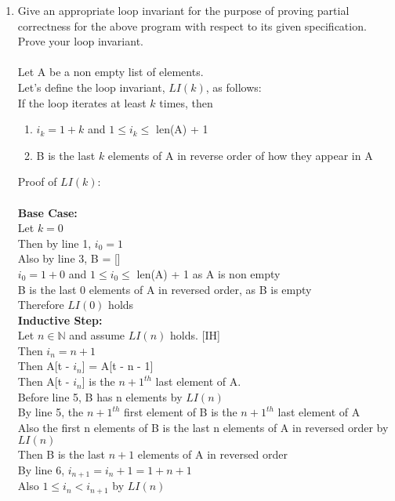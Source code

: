 \documentclass{article}
\begin{document}
\begin{enumerate}
\begin{enumerate}
	\item Give an appropriate loop invariant for the purpose of proving partial correctness for the above program 
	with respect to its given specification. \\
	Prove your loop invariant.\\\\
	Let A be a non empty list of elements.\\
	Let's define the loop invariant, $LI(k)$, as follows:\\
	If the loop iterates at least $k$ times, then
	\begin{enumerate}
	   \item ${i}_{k} = 1 + k$ and $1 \le {i}_{k}\le$ len(A) + 1
	   \item B is the last $k$ elements of A in reverse order of how they appear in A
	\end{enumerate}
\newpage
    Proof of $LI(k):$\\\\
	\textbf{Base Case:}\\
	Let $k = 0$\\
	Then by line 1, ${i}_{0} = 1$\\
	Also by line 3, B = [\:]\\
	${i}_{0} = 1 + 0$ and $1 \le {i}_{0} \le$ len(A) + 1 as A is non empty\\
	B is the last 0 elements of A in reversed order, as B is empty\\
	Therefore $LI(0)$ holds\\
	\textbf{Inductive Step:}\\
	Let $n \in\mathbb{N}$ and assume $LI(n)$ holds. [IH]\\
	Then ${i}_{n} = n + 1$\\
	Then A[t - ${i}_{n}$] = A[t - n - 1]\\
	Then A[t - ${i}_{n}$] is the ${n+1}^{th}$ last element of A.\\
	Before line 5, B has n elements by $LI(n)$\\
	By line 5, the ${n+1}^{th}$ first element of B is the ${n+1}^{th}$ last element of A\\
	Also the first n elements of B is the last n elements of A in reversed order by $LI(n)$\\
	Then B is the last $n+1$ elements of A in reversed order\\
	By line 6, ${i}_{n+1} = {i}_{n} + 1 = 1 + n + 1$\\
	Also $1 \le {i}_{n} < {i}_{n+1}$ by $LI(n)$\\

\end{enumerate}
\end{enumerate}
\end{document}

